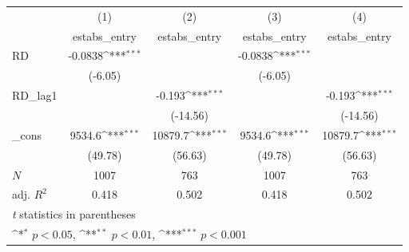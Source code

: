 \documentclass[12pt,english]{article}
\begin{document}
{
\def\sym#1{\ifmmode^{#1}\else\(^{#1}\)\fi}
\begin{tabular}{l*{4}{c}}
\hline\hline
            &\multicolumn{1}{c}{(1)}&\multicolumn{1}{c}{(2)}&\multicolumn{1}{c}{(3)}&\multicolumn{1}{c}{(4)}\\
            &\multicolumn{1}{c}{estabs\_entry}&\multicolumn{1}{c}{estabs\_entry}&\multicolumn{1}{c}{estabs\_entry}&\multicolumn{1}{c}{estabs\_entry}\\
\hline
RD          &     -0.0838\sym{***}&                     &     -0.0838\sym{***}&                     \\
            &     (-6.05)         &                     &     (-6.05)         &                     \\
[1em]
RD\_lag1     &                     &      -0.193\sym{***}&                     &      -0.193\sym{***}\\
            &                     &    (-14.56)         &                     &    (-14.56)         \\
[1em]
\_cons      &      9534.6\sym{***}&     10879.7\sym{***}&      9534.6\sym{***}&     10879.7\sym{***}\\
            &     (49.78)         &     (56.63)         &     (49.78)         &     (56.63)         \\
\hline
\(N\)       &        1007         &         763         &        1007         &         763         \\
adj. \(R^{2}\)&       0.418         &       0.502         &       0.418         &       0.502         \\
\hline\hline
\multicolumn{5}{l}{\footnotesize \textit{t} statistics in parentheses}\\
\multicolumn{5}{l}{\footnotesize \sym{*} \(p<0.05\), \sym{**} \(p<0.01\), \sym{***} \(p<0.001\)}\\
\end{tabular}
}
\end{document}
